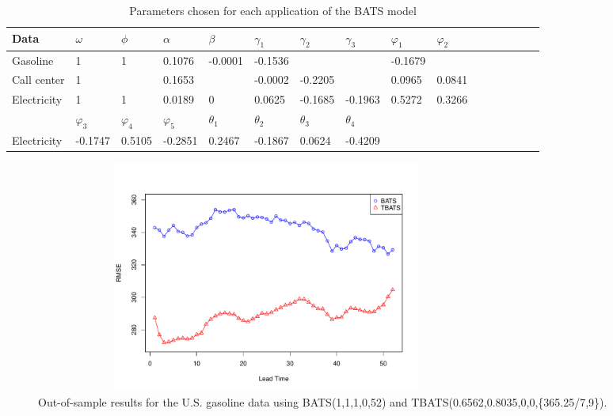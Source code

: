 \documentclass{uwstat572}
\begin{document}
\begin{table}[]
\small
\centering
\caption{Parameters chosen for each application of the BATS model}
\label{table:BATS}
\begin{tabular}{l l l l l l l l l l l l l l l l}
\hline \hline
Data &$\omega$ & $\phi$ & $\alpha$  & $\beta$ & $\gamma_1$ & $\gamma_2$ & $\gamma_3$ &  $\varphi_1$ & $\varphi_2$ \\
\hline
Gasoline &1 & 1 & 0.1076 & -0.0001 & -0.1536 &         &         &          -0.1679 &               \\ 
Call center &1 &   & 0.1653 &         & -0.0002 & -0.2205 &         &             0.0965  & 0.0841         \\
Electricity & 1 & 1 & 0.0189 & 0       & 0.0625  & -0.1685 & -0.1963 &  0.5272  & 0.3266 \\ \hline
 &$\varphi_3$&$\varphi_4$&$\varphi_5$ & $\theta_1$ & $\theta_2$ &  $\theta_3$ &$\theta_4$ &  \\
Electricity &  -0.1747 & 0.5105 & -0.2851&0.2467 & -0.1867 & 0.0624 & -0.4209    \\ \hline \hline
\end{tabular}
\end{table}

\begin{figure}[]
\centering
  \includegraphics[width=6in,height=3in]{gasRMSE.pdf}
  \caption{Out-of-sample results for the U.S. gasoline data using BATS(1,1,1,0,52) and TBATS(0.6562,0.8035,0,0,\{365.25/7,9\}).}
  \label{fig:gasRMSE}
\end{figure}
\end{document}
